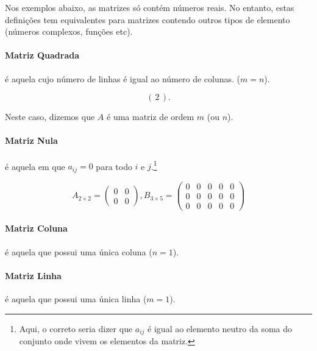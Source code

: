 Nos exemplos abaixo, as matrizes só contém números reais. No entanto, estas definições tem equivalentes para matrizes contendo outros tipos de elemento (números complexos, funções etc).

\paragraph*{Matriz Quadrada} é aquela cujo número de linhas é igual ao número de colunas. ($m=n$).
\begin{exemplo}
    \begin{equation*}
        \left( \, 2 \, \right).
    \end{equation*}
\end{exemplo}
Neste caso, dizemos que $A$ é uma matriz de ordem $m$ (ou $n$).

\paragraph*{Matriz Nula} é aquela em que $a_{ij} = 0$ para todo $i$ e $j$.\footnote{Aqui, o correto seria dizer que $a_{ij}$ é igual ao elemento neutro da soma do conjunto onde vivem os elementos da matriz.}
\begin{exemplo}
    \begin{equation*}
        A_{2\times 2} = 
            \begin{pmatrix}
                0 & 0\\
                0 & 0
            \end{pmatrix}
			, B_{3 \times 5} =
            \begin{pmatrix}
                0 & 0 & 0 & 0 & 0\\
                0 & 0 & 0 & 0 & 0\\
                0 & 0 & 0 & 0 & 0
            \end{pmatrix}
    \end{equation*}
\end{exemplo}

\paragraph*{Matriz Coluna} é aquela que possui uma única coluna ($n=1$).

\paragraph*{Matriz Linha} é aquela que possui uma única linha ($m=1$).

